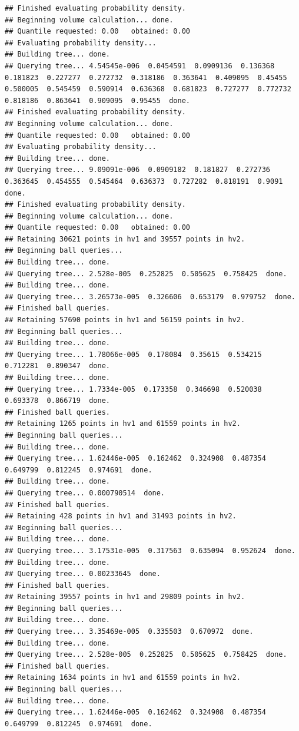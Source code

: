 \documentclass[12pt]{article}\usepackage[]{graphicx}\usepackage[]{color}
\makeatletter
\newenvironment{kframe}{%
 \def\at@end@of@kframe{}%
 \ifinner\ifhmode%
  \def\at@end@of@kframe{\end{minipage}}%
  \begin{minipage}{\columnwidth}%
 \fi\fi%
 \def\FrameCommand##1{\hskip\@totalleftmargin \hskip-\fboxsep
 \colorbox{shadecolor}{##1}\hskip-\fboxsep
     \hskip-\linewidth \hskip-\@totalleftmargin \hskip\columnwidth}%
 \MakeFramed {\advance\hsize-\width
   \@totalleftmargin\z@ \linewidth\hsize
   \@setminipage}}%
 {\par\unskip\endMakeFramed%
 \at@end@of@kframe}
\newenvironment{knitrout}{}{} %
\makeatother
\begin{document}
\begin{knitrout}
\begin{kframe}
\begin{verbatim}
## Finished evaluating probability density.
## Beginning volume calculation... done. 
## Quantile requested: 0.00   obtained: 0.00
## Evaluating probability density...
## Building tree... done.
## Querying tree... 4.54545e-006  0.0454591  0.0909136  0.136368  0.181823  0.227277  0.272732  0.318186  0.363641  0.409095  0.45455  0.500005  0.545459  0.590914  0.636368  0.681823  0.727277  0.772732  0.818186  0.863641  0.909095  0.95455  done.
## Finished evaluating probability density.
## Beginning volume calculation... done. 
## Quantile requested: 0.00   obtained: 0.00
## Evaluating probability density...
## Building tree... done.
## Querying tree... 9.09091e-006  0.0909182  0.181827  0.272736  0.363645  0.454555  0.545464  0.636373  0.727282  0.818191  0.9091  done.
## Finished evaluating probability density.
## Beginning volume calculation... done. 
## Quantile requested: 0.00   obtained: 0.00
## Retaining 30621 points in hv1 and 39557 points in hv2.
## Beginning ball queries... 
## Building tree... done.
## Querying tree... 2.528e-005  0.252825  0.505625  0.758425  done.
## Building tree... done.
## Querying tree... 3.26573e-005  0.326606  0.653179  0.979752  done.
## Finished ball queries. 
## Retaining 57690 points in hv1 and 56159 points in hv2.
## Beginning ball queries... 
## Building tree... done.
## Querying tree... 1.78066e-005  0.178084  0.35615  0.534215  0.712281  0.890347  done.
## Building tree... done.
## Querying tree... 1.7334e-005  0.173358  0.346698  0.520038  0.693378  0.866719  done.
## Finished ball queries. 
## Retaining 1265 points in hv1 and 61559 points in hv2.
## Beginning ball queries... 
## Building tree... done.
## Querying tree... 1.62446e-005  0.162462  0.324908  0.487354  0.649799  0.812245  0.974691  done.
## Building tree... done.
## Querying tree... 0.000790514  done.
## Finished ball queries. 
## Retaining 428 points in hv1 and 31493 points in hv2.
## Beginning ball queries... 
## Building tree... done.
## Querying tree... 3.17531e-005  0.317563  0.635094  0.952624  done.
## Building tree... done.
## Querying tree... 0.00233645  done.
## Finished ball queries. 
## Retaining 39557 points in hv1 and 29809 points in hv2.
## Beginning ball queries... 
## Building tree... done.
## Querying tree... 3.35469e-005  0.335503  0.670972  done.
## Building tree... done.
## Querying tree... 2.528e-005  0.252825  0.505625  0.758425  done.
## Finished ball queries. 
## Retaining 1634 points in hv1 and 61559 points in hv2.
## Beginning ball queries... 
## Building tree... done.
## Querying tree... 1.62446e-005  0.162462  0.324908  0.487354  0.649799  0.812245  0.974691  done.

\end{verbatim}
\end{kframe}
\end{knitrout}
\end{document}
